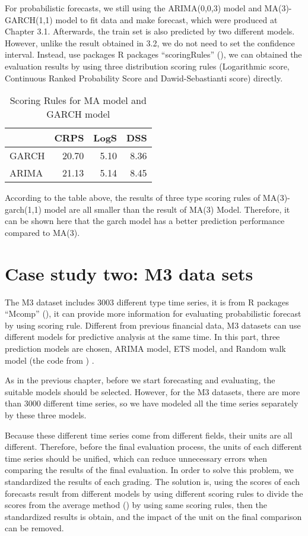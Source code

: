 \documentclass{monashthesis}
\theoremstyle{definition}
\theoremstyle{definition}
\theoremstyle{definition}
\theoremstyle{remark}
\begin{document}
For probabilistic forecasts, we still using the ARIMA(0,0,3) model and
MA(3)-GARCH(1,1) model to fit data and make forecast, which were
produced at Chapter 3.1. Afterwards, the train set is also predicted by
two different models. However, unlike the result obtained in 3.2, we do
not need to set the confidence interval. Instead, use packages R
packages ``scoringRules'' (\textcite{JKL17}), we can obtained the
evaluation results by using three distribution scoring rules
(Logarithmic score, Continuous Ranked Probability Score and
Dawid-Sebastianti score) directly.

\begin{table}

\caption{\label{tab:table2}Scoring Rules for MA model and GARCH model}
\centering
\begin{tabular}[t]{lrrr}
\toprule
  & CRPS & LogS & DSS\\
\midrule
GARCH & 20.70 & 5.10 & 8.36\\
ARIMA & 21.13 & 5.14 & 8.45\\
\bottomrule
\end{tabular}
\end{table}

According to the table above, the results of three type scoring rules of
MA(3)-garch(1,1) model are all smaller than the result of MA(3) Model.
Therefore, it can be shown here that the garch model has a better
prediction performance compared to MA(3).

\chapter{Case study two: M3 data
sets}\label{case-study-two-m3-data-sets}

The M3 dataset includes 3003 different type time series, it is from R
packages ``Mcomp'' (\textcite{RH182}), it can provide more information
for evaluating probabilistic forecast by using scoring rule. Different
from previous financial data, M3 datasets can use different models for
predictive analysis at the same time. In this part, three prediction
models are chosen, ARIMA model, ETS model, and Random walk model (the
code from \textcite{RH181}) .

As in the previous chapter, before we start forecasting and evaluating,
the suitable models should be selected. However, for the M3 datasets,
there are more than 3000 different time series, so we have modeled all
the time series separately by these three models.

Because these different time series come from different fields, their
units are all different. Therefore, before the final evaluation process,
the units of each different time series should be unified, which can
reduce unnecessary errors when comparing the results of the final
evaluation. In order to solve this problem, we standardized the results
of each grading. The solution is, using the scores of each forecasts
result from different models by using different scoring rules to divide
the scores from the average method (\textcite{RH181}) by using same
scoring rules, then the standardized results is obtain, and the impact
of the unit on the final comparison can be removed.
\end{document}
